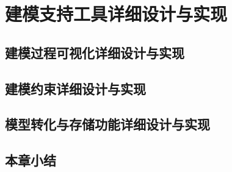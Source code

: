 \chapter{建模支持工具详细设计与实现}

\section{建模过程可视化详细设计与实现}

\section{建模约束详细设计与实现}

\section{模型转化与存储功能详细设计与实现}

\section{本章小结}